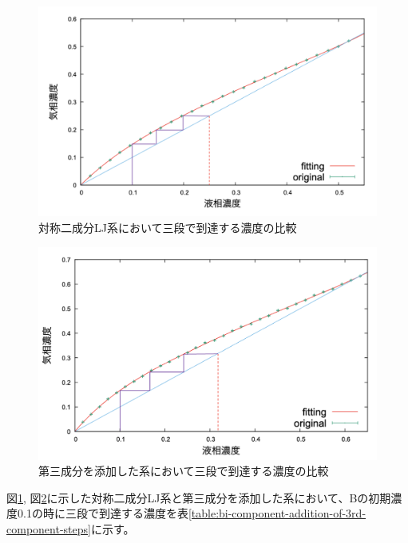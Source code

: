 \documentclass[titlepage]{jsreport}
\begin{document}
\begin{figure}[htbp]
    \begin{center}
        \includegraphics[width=14cm]{fig/steps-difference-E2.0/L100T1.0-part-fitting.png}
    \end{center}
    \caption{対称二成分LJ系において三段で到達する濃度の比較}
    \label{fig:bi-component-addition-of-3rd-component-steps-two-comnponent}
\end{figure}

\begin{figure}[htbp]
    \begin{center}
        \includegraphics[width=14cm]{fig/steps-difference-E2.0/L100T1.0CN50E2.0CD0.01-part-fitting.png}
    \end{center}
    \caption{第三成分を添加した系において三段で到達する濃度の比較}
    \label{fig:bi-component-addition-of-3rd-component-steps-three-comnponent}
\end{figure}

\newpage
図\ref{fig:bi-component-addition-of-3rd-component-steps-two-comnponent}, 図\ref{fig:bi-component-addition-of-3rd-component-steps-three-comnponent}に示した対称二成分LJ系と第三成分を添加した系において、Bの初期濃度0.1の時に三段で到達する濃度を表\ref{table:bi-component-addition-of-3rd-component-steps}に示す。
\end{document}
